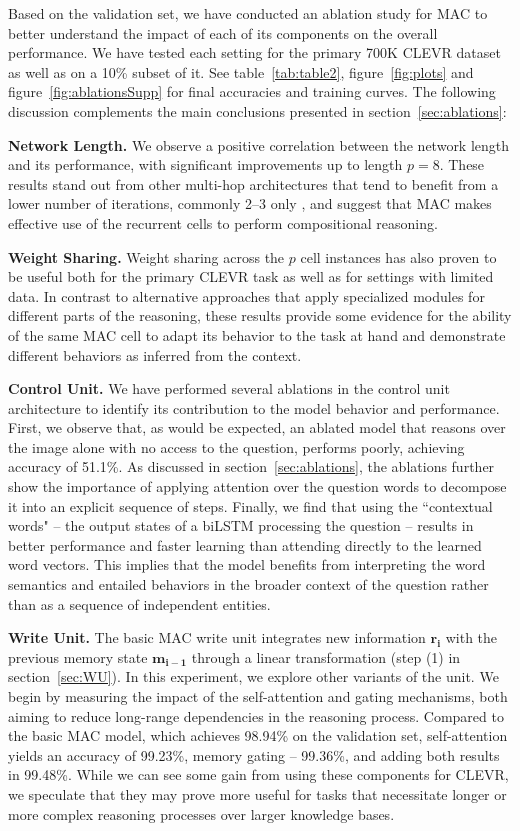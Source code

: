 \documentclass[fleqn]{article}
\newcommand{\figref}[1]{figure~\ref{fig:#1}}
\newcommand{\tabref}[1]{table~\ref{tab:#1}}
\newcommand{\secref}[1]{section~\ref{sec:#1}}
\begin{document}
Based on the validation set, we have conducted an ablation study for MAC to better understand the impact of each of its components on the overall performance. We have tested each setting for the primary 700K CLEVR dataset as well as on a 10\% subset of it. See \tabref{table2}, \figref{plots} and \figref{ablationsSupp} for final accuracies and training curves. The following discussion complements the main conclusions presented in \secref{ablations}:

\textbf{Network Length.} We observe a positive correlation between the network length and its performance, with significant improvements up to length \(p=8\). These results stand out from other multi-hop architectures that tend to benefit from a lower number of iterations, commonly 2--3 only \citep{saAtt, dmn}, and suggest that MAC makes effective use of the recurrent cells to perform compositional reasoning.



\textbf{Weight Sharing.} Weight sharing across the \(p\) cell instances has also proven to be useful both for the primary CLEVR task as well as for settings with limited data. 
In contrast to alternative approaches that apply specialized modules for different parts of the reasoning, these results provide some evidence for the ability of the same MAC cell to adapt its behavior to the task at hand and demonstrate different behaviors as inferred from the context.

\textbf{Control Unit.} We have performed several ablations in the control unit architecture to identify its contribution to the model behavior and performance. First, we observe that, as would be expected, an ablated model that reasons over the image alone with no access to the question, performs poorly, achieving accuracy of 51.1\%. As discussed in \secref{ablations}, the ablations further show the importance of applying attention over the question words to decompose it into an explicit sequence of steps. Finally, we find that using the ``contextual words" -- the output states of a biLSTM processing the question -- results in better performance and faster learning than attending directly to the learned word vectors. This implies that the model benefits from interpreting the word semantics and entailed behaviors in the broader context of the question rather than as a sequence of independent entities.

\textbf{Write Unit.} The basic MAC write unit integrates new information \(\boldsymbol{r_{i}}\) with the previous memory state \(\boldsymbol{m_{i-1}}\) through a linear transformation (step (1) in \secref{WU}). In this experiment, we explore other variants of the unit. We begin by measuring the impact of the self-attention and gating mechanisms, both aiming to reduce long-range dependencies in the reasoning process. Compared to the basic MAC model, which achieves 98.94\% on the validation set, self-attention yields an accuracy of 99.23\%, memory gating -- 99.36\%, and adding both results in 99.48\%. While we can see some gain from using these components for CLEVR, we speculate that they may prove more useful for tasks that necessitate longer or more complex reasoning processes over larger knowledge bases. 
\end{document}
